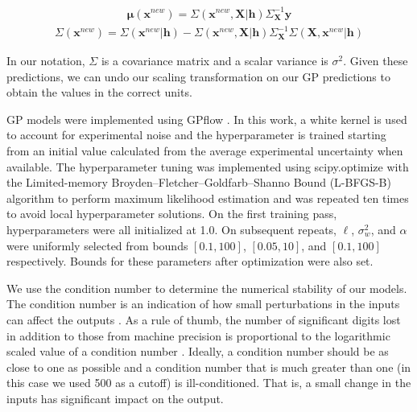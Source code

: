 \documentclass[journal=jacsat,manuscript=article]{achemso}
\begin{document}
\begin{gather*}
\boldsymbol{\mu}(\mathbf{x}^{new}) = \Sigma{(\mathbf{x}^{new},\mathbf{X}\vert \mathbf{h})} \Sigma_{\mathbf{X}}^{-1} \mathbf{\mathbf{y}}
\end{gather*}
\begin{gather*}
\Sigma(\mathbf{x}^{new}) = \Sigma(\mathbf{x}^{new} \vert \mathbf{h}) - \Sigma(\mathbf{x}^{new},\mathbf{X} \vert \mathbf{h}) \Sigma_{\mathbf{X}}^{-1} \Sigma(\mathbf{X},\mathbf{x}^{new}\vert \mathbf{h})
\end{gather*}

In our notation, $\Sigma$ is a covariance matrix and a scalar variance is $\sigma^2$. Given these predictions, we can undo our scaling transformation on our GP predictions to obtain the values in the correct units.

GP models were implemented using GPflow \cite{Matthews2017GPflow:TensorFlow}. In this work, a white kernel is used to account for experimental noise and the hyperparameter is trained starting from an initial value calculated from the average experimental uncertainty when available. The hyperparameter tuning was implemented using scipy.optimize \cite{Virtanen2020SciPyPython} with the Limited-memory Broyden–Fletcher–Goldfarb–Shanno Bound (L-BFGS-B) algorithm to perform maximum likelihood estimation and was repeated ten times to avoid local hyperparameter solutions. On the first training pass, hyperparameters were all initialized at 1.0. On subsequent repeats, $\ell$, $\sigma^2_w$, and $\alpha$ were uniformly selected from bounds $[0.1, 100]$, $[0.05, 10]$, and $[0.1, 100]$  respectively. Bounds for these parameters after optimization were also set.

We use the condition number to determine the numerical stability of our models. The condition number is an indication of how small perturbations in the inputs can affect the outputs \cite{Foster2009}. As a rule of thumb, the number of significant digits lost in addition to those from machine precision is proportional to the logarithmic scaled value of a condition number \cite{NumMathComput}. Ideally, a condition number should be as close to one as possible and a condition number that is much greater than one (in this case we used 500 as a cutoff) is ill-conditioned. That is, a small change in the inputs has significant impact on the output.
\end{document}
